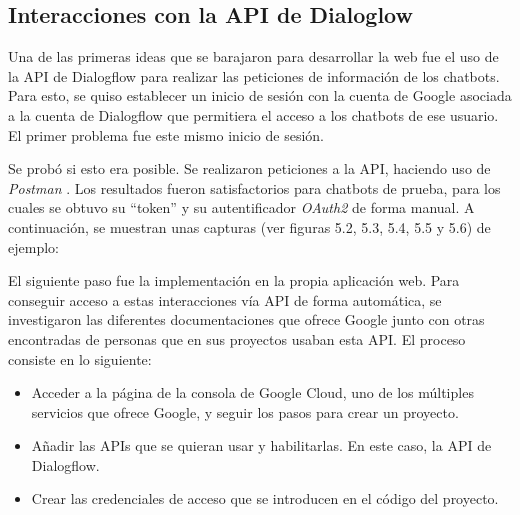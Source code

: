 \subsection{Interacciones con la API de Dialoglow}
Una de las primeras ideas que se barajaron para desarrollar la web fue el uso de la API de Dialogflow para realizar las peticiones de información de los chatbots. Para esto, se quiso establecer un inicio de sesión con la cuenta de Google asociada a la cuenta de Dialogflow que permitiera el acceso a los chatbots de ese usuario. El primer problema fue este mismo inicio de sesión. 

Se probó si esto era posible. Se realizaron peticiones a la API, haciendo uso de \textit{Postman} \cite{PostmanA62:online}. Los resultados fueron satisfactorios para chatbots de prueba, para los cuales se obtuvo su ``token'' y su autentificador \textit{OAuth2} de forma manual. A continuación, se muestran unas capturas (ver figuras 5.2, 5.3, 5.4, 5.5 y 5.6) de ejemplo:

El siguiente paso fue la implementación en la propia aplicación web. Para conseguir acceso a estas interacciones vía API de forma automática, se investigaron las diferentes documentaciones que ofrece Google junto con otras encontradas de personas que en sus proyectos usaban esta API. El proceso consiste en lo siguiente:
\begin{itemize}
    \item Acceder a la página de la consola de Google Cloud, uno de los múltiples servicios que ofrece Google, y seguir los pasos para crear un proyecto.
    \item Añadir las APIs que se quieran usar y habilitarlas. En este caso, la API de Dialogflow.
    \item Crear las credenciales de acceso que se introducen en el código del proyecto.
\end{itemize} 

